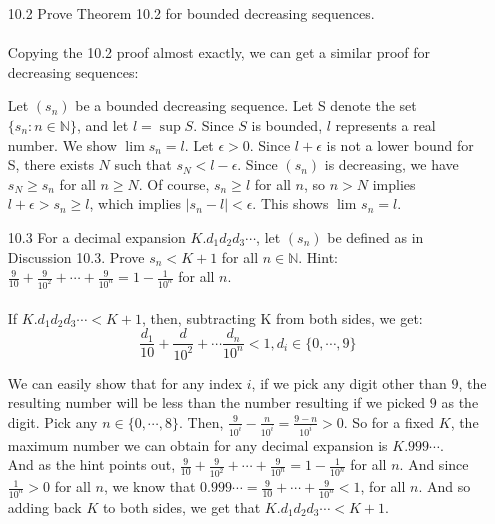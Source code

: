 
\usepackage{amsmath, dsfont}

\oddsidemargin 0in
\evensidemargin 0in
\textwidth 6.5in
\topmargin -0.5in
\textheight 9.0in
\newcommand{\norm}[1]{\left\lVert #1 \right\rVert}
\newcommand{\abs}[1]{\left\vert #1 \right\vert}
\newcommand{\?}{\stackrel{?}{=}}



\pagestyle{myheadings}

\begin{itemize}
  \item [10.2]
    Prove Theorem 10.2 for bounded decreasing sequences.\\\\

    Copying the 10.2 proof almost exactly, we can get a similar proof for decreasing sequences:

    Let $(s_n)$ be a bounded decreasing sequence. Let S denote the set $\{ s_n : n \in \mathds{N} \}$, and let $l = \sup S$. Since $S$ is bounded, $l$ represents a real number. We show $\lim s_n = l$. Let $\epsilon > 0$. Since $l + \epsilon$ is not a lower bound for S, there exists $N$ such that $s_N < l - \epsilon$. Since $(s_n)$ is decreasing, we have $s_N \geq s_n$ for all $n \geq N$. Of course, $s_n \geq l$ for all $n$, so $n > N$ implies $l + \epsilon > s_n \geq l$, which implies $\abs{s_n - l} < \epsilon$. This shows $\lim_{} s_n = l$.
  \item [10.3]
    For a decimal expansion $K.d_1d_2d_3 \cdots$, let $(s_n)$ be defined as in Discussion 10.3. Prove $s_n < K + 1$ for all $n \in \mathds{N}$. Hint: $\frac{9}{10} + \frac{9}{10^2} + \cdots + \frac{9}{10^n} = 1 - \frac{1}{10^n}$ for all $n$.\\\\

    If $K.d_1d_2d_3 \cdots < K + 1$, then, subtracting K from both sides, we get:
    $$\frac{d_1}{10} + \frac{d}{10^2} + \cdots \frac{d_n}{10^n} < 1, d_i \in \{0, \cdots , 9 \}$$

    We can easily show that for any index $i$, if we pick any digit other than $9$, the resulting number will be less than the number resulting if we picked $9$ as the digit. Pick any $n \in \{0, \cdots, 8 \}$. Then, $\frac{9}{10^i} - \frac{n}{10^i} = \frac{9-n}{10^i} > 0$. So for a fixed $K$, the maximum number we can obtain for any decimal expansion is $K.999 \cdots$.\\

    And as the hint points out, $\frac{9}{10} + \frac{9}{10^2} + \cdots + \frac{9}{10^n} = 1 - \frac{1}{10^n}$ for all $n$. And since $\frac{1}{10^n} > 0$ for all $n$, we know that $0.999 \cdots = \frac{9}{10} + \cdots + \frac{9}{10^n} < 1$, for all $n$. And so adding back $K$ to both sides, we get that $K.d_1d_2d_3 \cdots < K + 1$.\\


\end{itemize}
